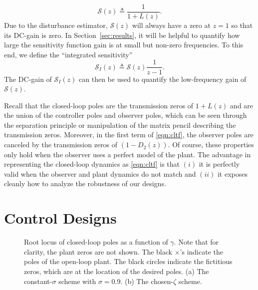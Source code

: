 \documentclass[twocolumn,twoside]{IEEEtran}
\begin{document}
\begin{equation}
  \mathcal{S}(z)\triangleq \frac{1}{1+L(z)}.\label{eqn:Sens}
\end{equation}
Due to the disturbance estimator, $\mathcal{S}(z)$ will always have a zero at $z=1$ so that its DC-gain is zero. In Section~\ref{sec:results}, it will be helpful to quantify how large the sensitivity function gain is at small but non-zero frequencies. To this end, we define the ``integrated sensitivity''
\begin{equation}
\mathcal{S}_I(z)\triangleq \mathcal{S}(z)\frac{1}{z-1} \label{eqn:S_int}.
\end{equation}
The DC-gain of $\mathcal{S}_I(z)$ can then be used to quantify the low-frequency gain of $\mathcal{S}(z)$.

Recall that the closed-loop poles are the transmission zeros of $1+L(z)$ and are the union of the controller poles and observer poles, which can be seen through the separation principle or manipulation of the matrix pencil describing the transmission zeros. Moreover, in the first term of \eqref{eqn:cltf}, the observer poles are canceled by the transmission zeros of $(1-D_2(z))$. Of course, these properties only hold when the observer uses a perfect model of the plant. The advantage in representing the closed-loop dynamics as \eqref{eqn:cltf} is that $(i)$ it is perfectly valid when the observer and plant dynamics do not match and $(ii)$ it exposes cleanly how to analyze the robustness of our designs. 


%   


\section{Control Designs}\label{sec:tune}
\begin{figure}
    \begin{subfigure}{0.48\textwidth}
  
\caption{}
  \label{fig:lqr_locus_cs}
\end{subfigure}
\hfill
\begin{subfigure}{0.48\textwidth}
  
  \caption{}
  \label{fig:lqr_locus_cz}
\end{subfigure}
\caption{Root locus of closed-loop poles as a function of $\gamma$. Note that for clarity, the plant zeros are not shown. The black $\times$'s indicate the poles of the open-loop plant. The black circles indicate the fictitious zeros, which are at the location of the desired poles. (a) The constant-$\sigma$ scheme with $\sigma=0.9$. (b) The chosen-$\zeta$ scheme.}
\label{fig:lqr_locus}
\end{figure}
\end{document}
